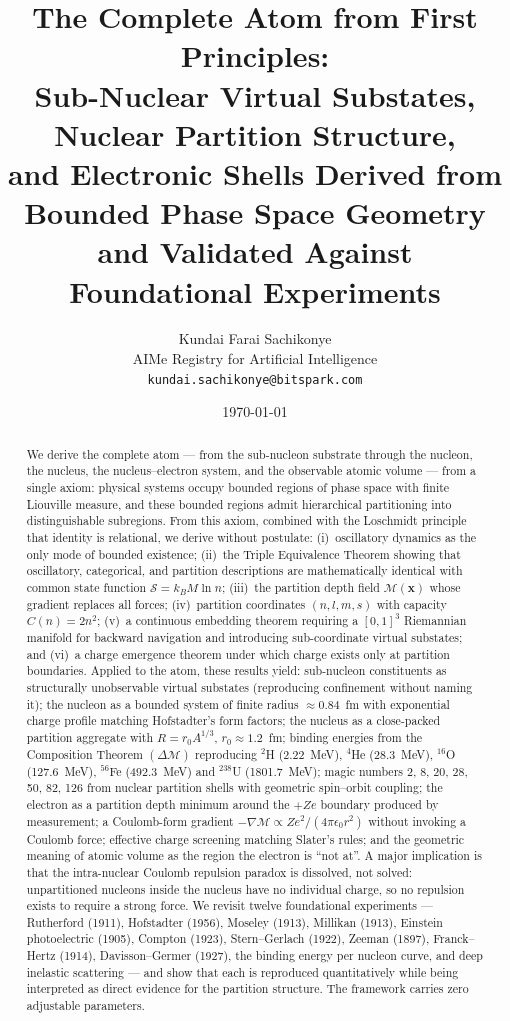 \documentclass[11pt,a4paper]{article}
\title{\textbf{The Complete Atom from First Principles:\\[2pt]
Sub-Nuclear Virtual Substates, Nuclear Partition Structure,\\ and Electronic Shells Derived from Bounded Phase Space Geometry\\ and Validated Against Foundational Experiments}}
\author{Kundai Farai Sachikonye\\
AIMe Registry for Artificial Intelligence\\
\texttt{kundai.sachikonye@bitspark.com}}
\date{\today}
\theoremstyle{definition}
\theoremstyle{remark}
\newcommand{\kB}{k_{\scriptscriptstyle B}}
\newcommand{\Depth}{\mathcal{M}}
\begin{document}
\maketitle

\begin{abstract}
We derive the complete atom --- from the sub-nucleon substrate through the nucleon, the nucleus, the nucleus--electron system, and the observable atomic volume --- from a single axiom: physical systems occupy bounded regions of phase space with finite Liouville measure, and these bounded regions admit hierarchical partitioning into distinguishable subregions. From this axiom, combined with the Loschmidt principle that identity is relational, we derive without postulate: (i)~oscillatory dynamics as the only mode of bounded existence; (ii)~the Triple Equivalence Theorem showing that oscillatory, categorical, and partition descriptions are mathematically identical with common state function $\mathcal{S} = \kB M \ln n$; (iii)~the partition depth field $\Depth(\mathbf{x})$ whose gradient replaces all forces; (iv)~partition coordinates $(n,l,m,s)$ with capacity $C(n)=2n^2$; (v)~a continuous embedding theorem requiring a $[0,1]^3$ Riemannian manifold for backward navigation and introducing sub-coordinate virtual substates; and (vi)~a charge emergence theorem under which charge exists only at partition boundaries. Applied to the atom, these results yield: sub-nucleon constituents as structurally unobservable virtual substates (reproducing confinement without naming it); the nucleon as a bounded system of finite radius $\approx 0.84$~fm with exponential charge profile matching Hofstadter's form factors; the nucleus as a close-packed partition aggregate with $R = r_0 A^{1/3}$, $r_0 \approx 1.2$~fm; binding energies from the Composition Theorem $(\Delta\Depth)$ reproducing $^2$H (2.22~MeV), $^4$He (28.3~MeV), $^{16}$O (127.6~MeV), $^{56}$Fe (492.3~MeV) and $^{238}$U (1801.7~MeV); magic numbers 2, 8, 20, 28, 50, 82, 126 from nuclear partition shells with geometric spin--orbit coupling; the electron as a partition depth minimum around the $+Ze$ boundary produced by measurement; a Coulomb-form gradient $-\nabla\Depth \propto Ze^2/(4\pi\epsilon_0 r^2)$ without invoking a Coulomb force; effective charge screening matching Slater's rules; and the geometric meaning of atomic volume as the region the electron is ``not at''. A major implication is that the intra-nuclear Coulomb repulsion paradox is dissolved, not solved: unpartitioned nucleons inside the nucleus have no individual charge, so no repulsion exists to require a strong force. We revisit twelve foundational experiments --- Rutherford (1911), Hofstadter (1956), Moseley (1913), Millikan (1913), Einstein photoelectric (1905), Compton (1923), Stern--Gerlach (1922), Zeeman (1897), Franck--Hertz (1914), Davisson--Germer (1927), the binding energy per nucleon curve, and deep inelastic scattering --- and show that each is reproduced quantitatively while being interpreted as direct evidence for the partition structure. The framework carries zero adjustable parameters.
\end{abstract}
\end{document}
